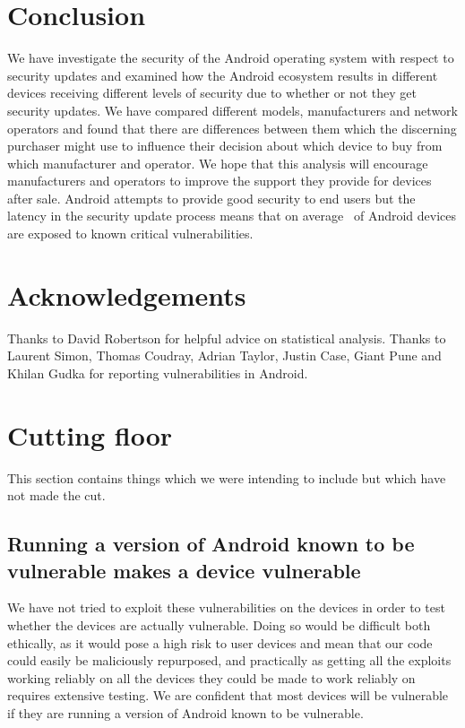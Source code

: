 \documentclass[conference,a4paper,twoside]{IEEEtran}
\let\OldTodo\todo
\renewcommand{\todo}{\OldTodo[inline]}
\begin{document}
\section{Conclusion}
\label{sec:conclusion}
We have investigate the security of the Android operating system with respect to security updates and examined how the Android ecosystem results in different devices receiving different levels of security due to whether or not they get security updates.
We have compared different models, manufacturers and network operators and found that there are differences between them which the discerning purchaser might use to influence their decision about which device to buy from which manufacturer and operator.
We hope that this analysis will encourage manufacturers and operators to improve the support they provide for devices after sale.
Android attempts to provide good security to end users but the latency in the security update process means that on average \daMeanInsecurityPerc\ of Android devices are exposed to known critical vulnerabilities.


\section*{Acknowledgements}
Thanks to David Robertson for helpful advice on statistical analysis.
Thanks to Laurent Simon, Thomas Coudray, Adrian Taylor, Justin Case, Giant Pune and Khilan Gudka for reporting vulnerabilities in Android.


\printbibliography


\listoftodos


\section{Cutting floor}

This section contains things which we were intending to include but which have not made the cut.

\subsection{Running a version of Android known to be vulnerable makes a device vulnerable}
We have not tried to exploit these vulnerabilities on the devices in order to test whether the devices are actually vulnerable.
Doing so would be difficult both ethically, as it would pose a high risk to user devices and mean that our code could easily be maliciously repurposed, and practically as getting all the exploits working reliably on all the devices they could be made to work reliably on requires extensive testing.
We are confident that most devices will be vulnerable if they are running a version of Android known to be vulnerable. \todo{WHY?}
\end{document}
